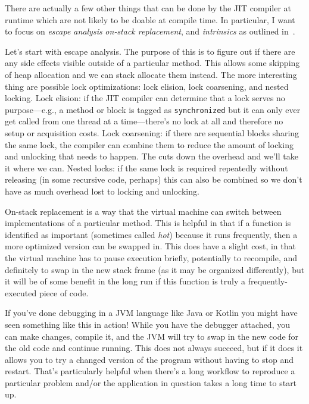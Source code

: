 \documentclass[a4paper]{report}
\begin{document}
There are actually a few other things that can be done by the JIT compiler at runtime which are not likely to be doable at compile time. In particular, I want to focus on \textit{escape analysis} \textit{on-stack replacement}, and \textit{intrinsics} as outlined in~\cite{escape}.

Let's start with escape analysis. The purpose of this is to figure out if there are any side effects visible outside of a particular method. This allows some skipping of heap allocation and we can stack allocate them instead. The more interesting thing are possible lock optimizations: lock elision, lock coarsening, and nested locking. Lock elision: if the JIT compiler can determine that a lock serves no purpose---e.g., a method or block is tagged as \texttt{synchronized} but it can only ever get called from one thread at a time---there's no lock at all and therefore no setup or acquisition costs.  Lock coarsening: if there are sequential blocks sharing the same lock, the compiler can combine them to reduce the amount of locking and unlocking that needs to happen. The cuts down the overhead and we'll take it where we can. Nested locks: if the same lock is required repeatedly without releasing (in some recursive code, perhaps) this can also be combined so we don't have as much overhead lost to locking and unlocking.

On-stack replacement is a way that the virtual machine can switch between implementations of a particular method. This is helpful in that if a function is identified as important (sometimes called \textit{hot}) because it runs frequently, then a more optimized version can be swapped in. This does have a slight cost, in that the virtual machine has to pause execution briefly, potentially to recompile, and definitely to swap in the new stack frame (as it may be organized differently), but it will be of some benefit in the long run if this function is truly a frequently-executed piece of code.

If you've done debugging in a JVM language like Java or Kotlin you might have seen something like this in action! While you have the debugger attached, you can make changes, compile it, and the JVM will try to swap in the new code for the old code and continue running. This does not always succeed, but if it does it allows you to try a changed version of the program without having to stop and restart. That's particularly helpful when there's a long workflow to reproduce a particular problem and/or the application in question takes a long time to start up.
\end{document}
